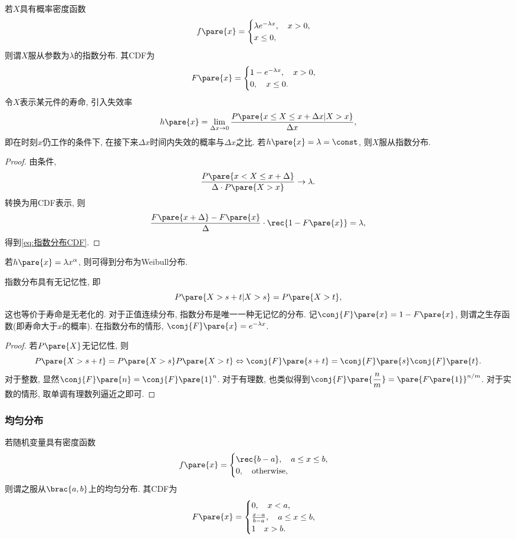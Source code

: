 \documentclass[../Statistics.tex]{subfiles}
\begin{document}
若$X$具有概率密度函数
\[ f\pare{x} = \begin{cases}
    \lambda e^{-\lambda x},\quad x> 0,\\
    x \le 0,
\end{cases} \]
则谓$X$服从参数为$\lambda$的指数分布. 其CDF为
\begin{equation}
    F\pare{x} = \begin{cases}
    \label{eq:指数分布CDF}
    1 - e^{-\lambda x},\quad x> 0,\\
    0,\quad x\le 0.
    \end{cases}
\end{equation}
令$X$表示某元件的寿命, 引入失效率
\[ h\pare{x} = \lim_{\Delta x \rightarrow 0} \frac{P\pare{x \le X \le x+\Delta x \vert X>x}}{\Delta x}, \]
即在时刻$x$仍工作的条件下, 在接下来$\Delta x$时间内失效的概率与$\Delta x$之比. 若$h\pare{x} = \lambda = \const$, 则$X$服从指数分布.
\begin{proof}
    由条件,
    \[ \frac{P\pare{x<X\le x+\Delta}}{\Delta \cdot P\pare{X>x}} \rightarrow \lambda. \]
    转换为用CDF表示, 则
    \[ \frac{F\pare{x+\Delta} - F\pare{x}}{\Delta}\cdot \rec{1-F\pare{x}} = \lambda, \]
    得到\eqref{eq:指数分布CDF}.
\end{proof}
\begin{remark}
    若$h\pare{x} = \lambda x^\alpha$, 则可得到分布为Weibull分布.
\end{remark}
指数分布具有无记忆性, 即
\[ P\pare{X>s+t \vert X>s} = P\pare{X>t}, \]
这也等价于寿命是无老化的. 对于正值连续分布, 指数分布是唯一一种无记忆的分布. 记$\conj{F}\pare{x} = 1 - F\pare{x}$, 则谓之生存函数(即寿命大于$x$的概率). 在指数分布的情形, $\conj{F}\pare{x} = e^{-\lambda x}$.
\begin{proof}
    若$P\pare{X}$无记忆性, 则
    \[ P\pare{X>s+t} = P\pare{X>s}P\pare{X>t} \Leftrightarrow \conj{F}\pare{s+t} = \conj{F}\pare{s}\conj{F}\pare{t}. \]
    对于整数, 显然$\conj{F}\pare{n} = \conj{F}\pare{1}^n$. 对于有理数, 也类似得到$\displaystyle \conj{F}\pare{\frac{n}{m}} = \pare{F\pare{1}}^{n/m}$. 对于实数的情形, 取单调有理数列逼近之即可.
\end{proof}


\subsubsection{均匀分布} %
\label{ssub:均匀分布}

若随机变量具有密度函数
\[ f\pare{x} = \begin{cases}
    \rec{b-a},\quad a\le x\le b,\\
    0,\quad \mathrm{otherwise},
\end{cases} \]
则谓之服从$\brac{a,b}$上的均匀分布. 其CDF为
\[ F\pare{x} = \begin{cases}
    0,\quad x<a,\\
    \frac{x-a}{b-a},\quad a\le x\le b,\\
    1\quad x>b.
\end{cases} \]
\end{document}
